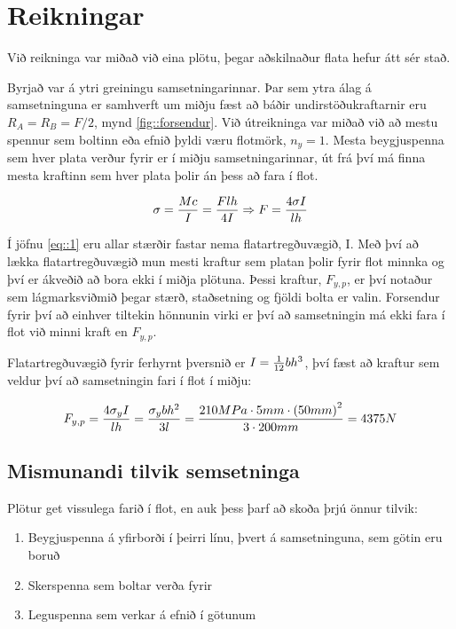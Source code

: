 \section{Reikningar}\label{ch::reikningar}

Við reikninga var miðað við eina plötu, \te þegar aðskilnaður flata hefur átt sér stað. 

Byrjað var á ytri greiningu samsetningarinnar. 
Þar sem ytra álag á samsetninguna er samhverft um miðju fæst að báðir undirstöðukraftarnir eru $R_{A} = R_{B} = F/2$, \sbr mynd \ref{fig::forsendur}. 
Við útreikninga var miðað við að mestu spennur sem boltinn eða efnið þyldi væru flotmörk, \te $n_y = 1$. 
Mesta beygjuspenna sem hver plata verður fyrir er í miðju samsetningarinnar, út frá því má finna mesta kraftinn sem hver plata þolir án þess að fara í flot.

\begin{equation}
  \sigma = {M c \over I} = {F l h \over 4I} 
  \Rightarrow F = {4 \sigma I \over l h}
  \label{eq::1}
\end{equation}

Í jöfnu \ref{eq::1} eru allar stærðir fastar nema flatartregðuvægið, I. 
Með því að lækka flatartregðuvægið mun mesti kraftur sem platan þolir fyrir flot minnka og því er ákveðið að bora ekki í miðja plötuna. 
Þessi kraftur, $F_{y,p}$, er því notaður sem lágmarksviðmið þegar stærð, staðsetning og fjöldi bolta er valin. 
Forsendur fyrir því að einhver tiltekin hönnunin virki er því að samsetningin má ekki fara í flot við minni kraft en $F_{y,p}$.

Flatartregðuvægið fyrir ferhyrnt þversnið er $I = {1 \over 12}bh^3$, því fæst að kraftur sem veldur því að samsetningin fari í flot í miðju:

\[
F_{y,p} 
= 
{
  4  \sigma_y I 
  \over 
  l h
}
= 
{
  \sigma_y b h^2 
  \over 
  3 l
} 
= 
{
  210 MPa \cdot 5 mm \cdot \left( 50 mm \right)^2 
  \over 
  3 \cdot 200mm
} 
= 4375N
\]

\subsection{Mismunandi tilvik semsetninga}

Plötur get vissulega farið í flot, en auk þess þarf að skoða þrjú önnur tilvik:

\begin{enumerate}
\item Beygjuspenna á yfirborði í þeirri línu, þvert á samsetninguna, sem götin eru boruð
\item Skerspenna sem boltar verða fyrir
\item Leguspenna sem verkar á efnið í götunum
\end{enumerate}

